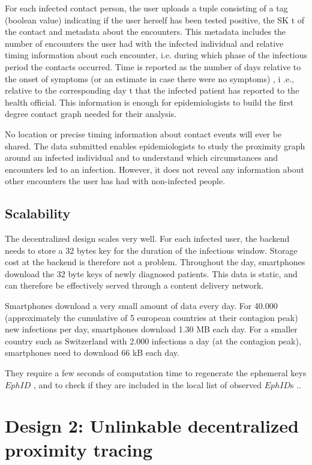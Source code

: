 \documentclass[10.8pt,a4paper]{article}
\begin{document}
For each infected contact person, the user uploads a tuple consisting of a tag (boolean value) indicating if the user herself has been tested positive, the  SK t of the contact and metadata about the encounters. This metadata includes the number of encounters the user had with the infected individual and relative timing information about each encounter, i.e. during which phase of the infectious period the contacts occurred. Time is reported as the number of days  relative to the onset of symptoms (or an estimate in case there were no symptoms) , i  .e., relative to the corresponding day  t that the infected patient has reported to the health official. This information is enough for epidemiologists to build the first degree contact graph needed for their analysis.

No location or precise timing information about contact events will ever be shared. The data submitted enables epidemiologists to study the  proximity graph around an infected individual and to understand which circumstances and encounters led to an infection. However, it does not reveal any information about other encounters the user has had with non-infected people.

\subsection{Scalability}
The decentralized design scales very well. For each infected user, the backend needs to
store a 32 bytes key for the duration of the infectious window. Storage cost at the backend is therefore not a problem. Throughout the day, smartphones download the 32 byte keys of newly diagnosed patients. This data is static, and can therefore be effectively served through a content delivery network.

Smartphones download a very small amount of data every day. For 40.000 (approximately the cumulative of 5 european countries at their contagion peak) new infections per day, smartphones download 1.30 MB each day. For a smaller country such as Switzerland with 2.000 infections a day (at the contagion peak), smartphones need to download 66 kB each day. 

They require a few seconds of computation time to regenerate the ephemeral keys $EphID$ , and to check if they are included in the local list of observed  $EphID$s ..

\clearpage

\section{Design 2: Unlinkable decentralized proximity tracing}
\end{document}
